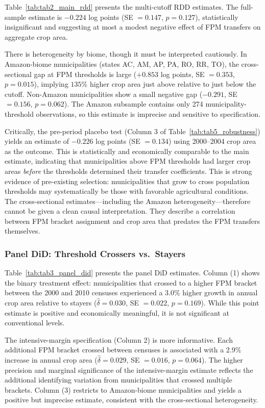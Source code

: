 \documentclass[12pt]{article}
\begin{document}
Table~\ref{tab:tab2_main_rdd} presents the multi-cutoff RDD estimates. The full-sample estimate is $-0.224$ log points (SE $= 0.147$, $p = 0.127$), statistically insignificant and suggesting at most a modest negative effect of FPM transfers on aggregate crop area.

There is heterogeneity by biome, though it must be interpreted cautiously. In Amazon-biome municipalities (states AC, AM, AP, PA, RO, RR, TO), the cross-sectional gap at FPM thresholds is large ($+0.853$ log points, SE $= 0.353$, $p = 0.015$), implying $135\%$ higher crop area just above relative to just below the cutoff. Non-Amazon municipalities show a small negative gap ($-0.291$, SE $= 0.156$, $p = 0.062$). The Amazon subsample contains only 274 municipality-threshold observations, so this estimate is imprecise and sensitive to specification.

Critically, the pre-period placebo test (Column 3 of Table~\ref{tab:tab5_robustness}) yields an estimate of $-0.226$ log points (SE $= 0.134$) using 2000--2004 crop area as the outcome. This is statistically and economically comparable to the main estimate, indicating that municipalities above FPM thresholds had larger crop areas \textit{before} the thresholds determined their transfer coefficients. This is strong evidence of pre-existing selection: municipalities that grow to cross population thresholds may systematically be those with favorable agricultural conditions. The cross-sectional estimates---including the Amazon heterogeneity---therefore cannot be given a clean causal interpretation. They describe a correlation between FPM bracket assignment and crop area that predates the FPM transfers themselves.

\subsubsection*{Panel DiD: Threshold Crossers vs.\ Stayers}

Table~\ref{tab:tab3_panel_did} presents the panel DiD estimates. Column (1) shows the binary treatment effect: municipalities that crossed to a higher FPM bracket between the 2000 and 2010 censuses experienced a 3.0\% higher growth in annual crop area relative to stayers ($\hat{\delta} = 0.030$, SE $= 0.022$, $p = 0.169$). While this point estimate is positive and economically meaningful, it is not significant at conventional levels.

The intensive-margin specification (Column 2) is more informative. Each additional FPM bracket crossed between censuses is associated with a 2.9\% increase in annual crop area ($\hat{\delta} = 0.029$, SE $= 0.016$, $p = 0.064$). The higher precision and marginal significance of the intensive-margin estimate reflects the additional identifying variation from municipalities that crossed multiple brackets. Column (3) restricts to Amazon-biome municipalities and yields a positive but imprecise estimate, consistent with the cross-sectional heterogeneity.
\end{document}
